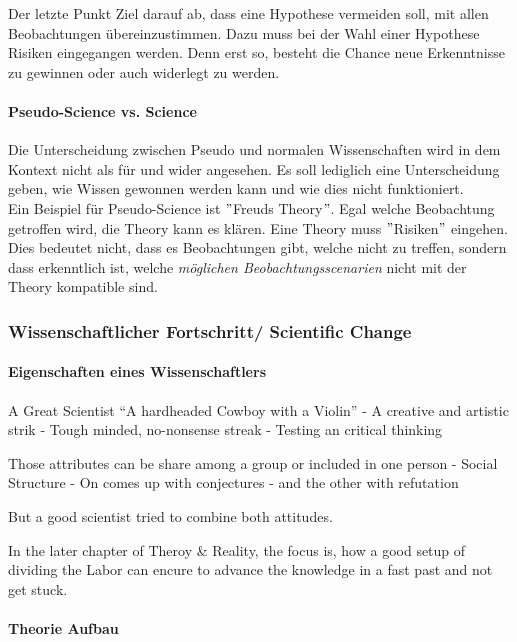 Der letzte Punkt Ziel darauf ab, dass eine Hypothese vermeiden soll, mit allen Beobachtungen übereinzustimmen. Dazu muss bei der Wahl einer Hypothese Risiken eingegangen werden. Denn erst so, besteht die Chance neue Erkenntnisse zu gewinnen oder auch widerlegt zu werden.

\paragraph{Pseudo-Science vs. Science}
Die Unterscheidung zwischen Pseudo und normalen Wissenschaften wird in dem Kontext nicht als für und wider angesehen. Es soll lediglich eine Unterscheidung geben, wie Wissen gewonnen werden kann und wie dies nicht funktioniert.\\

Ein Beispiel für Pseudo-Science ist $"$Freuds Theory$"$. Egal welche Beobachtung getroffen wird, die Theory kann es klären. Eine Theory muss $"$Risiken$"$ eingehen. Dies bedeutet nicht, dass es Beobachtungen gibt, welche nicht zu treffen, sondern dass erkenntlich ist, welche \textit{möglichen Beobachtungsscenarien} nicht mit der Theory kompatible sind.

\subsubsection{Wissenschaftlicher Fortschritt/ Scientific Change}

\paragraph{Eigenschaften eines Wissenschaftlers}

 A Great Scientist
“A hardheaded Cowboy with a Violin”
- A creative and artistic strik
- Tough minded, no-nonsense streak - Testing an critical thinking

Those attributes can be share among a group or included in one person
- Social Structure
    - On comes up with conjectures 
    - and the other with refutation

But a good scientist tried to combine both attitudes.

In the later chapter of Theroy & Reality, the focus is, how a good setup of dividing the Labor can encure to advance the knowledge in a fast past and not get stuck.

\paragraph{Theorie Aufbau}


